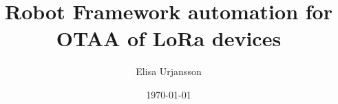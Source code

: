 
\def\thesislang{english} %

\def\secondlang{finnish} %

\author{Elisa Urjansson} %
\def\thesisfi{Insinöörityö}%
\def\thesisen{Thesis}

\def\alaotsikko{Alaotsikko/Subtitle} %

\def\otsikko{LoRa laitteiden autentikaation automatisointi langattomasti Robot Frameworkilla}
\def\tutkinto{Insinööri (AMK)} %
\def\kohjelma{Tieto\textendash ja viestintätekniikka}
\def\suuntautumis{Älykkäät järjestelmät}
\def\ohjaajat{
Projekti-insinööri Joseph Hotchkiss\newline
}
\def\avainsanat{LoRa, IoT, Robot Framework, ohjelmistorobotiikka, ChirpStack}
\def\pvm{\specialdate\today}

\title{Robot Framework automation for OTAA of LoRa devices}
\def\metropoliadegree {Bachelor of Engineering} %
\def\metropoliadegreeprogramme {Information and Communication Technology}
\def\metropoliaspecialisation {Smart Systems}
\def\metropoliainstructors {
Joseph Hotchkiss, Project Engineer\newline
}
\def\metropoliakeywords {LoRa, Internet of Things, Robot Framework, Robotic Process Automation, ChirpStack}
\date{\longmonth\today}


